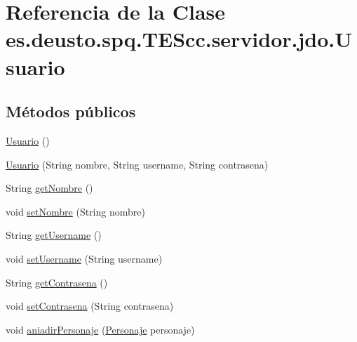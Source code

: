 \hypertarget{classes_1_1deusto_1_1spq_1_1_t_e_scc_1_1servidor_1_1jdo_1_1_usuario}{\section{Referencia de la Clase es.\+deusto.\+spq.\+T\+E\+Scc.\+servidor.\+jdo.\+Usuario}
\label{classes_1_1deusto_1_1spq_1_1_t_e_scc_1_1servidor_1_1jdo_1_1_usuario}
}
\subsection*{Métodos públicos}
\begin{DoxyCompactItemize}
\item 
\hyperlink{classes_1_1deusto_1_1spq_1_1_t_e_scc_1_1servidor_1_1jdo_1_1_usuario_a607ede79f8a7cdee04a8e3de619f1fcf}{Usuario} ()
\item 
\hyperlink{classes_1_1deusto_1_1spq_1_1_t_e_scc_1_1servidor_1_1jdo_1_1_usuario_a137a01fd100dccc041df326ca16caff6}{Usuario} (String nombre, String username, String contrasena)
\item 
String \hyperlink{classes_1_1deusto_1_1spq_1_1_t_e_scc_1_1servidor_1_1jdo_1_1_usuario_aa9175f3107f81ecc9e272a58ff9509d1}{get\+Nombre} ()
\item 
void \hyperlink{classes_1_1deusto_1_1spq_1_1_t_e_scc_1_1servidor_1_1jdo_1_1_usuario_aad7942b71efd65fd7b27d26cab1c2623}{set\+Nombre} (String nombre)
\item 
String \hyperlink{classes_1_1deusto_1_1spq_1_1_t_e_scc_1_1servidor_1_1jdo_1_1_usuario_a82df5180138094f3ed1c692e32b91c72}{get\+Username} ()
\item 
void \hyperlink{classes_1_1deusto_1_1spq_1_1_t_e_scc_1_1servidor_1_1jdo_1_1_usuario_ae4f0449c1f8731b9d7d4f4c71242b1e1}{set\+Username} (String username)
\item 
String \hyperlink{classes_1_1deusto_1_1spq_1_1_t_e_scc_1_1servidor_1_1jdo_1_1_usuario_afd1695e7957e71acbaae97c361216dd5}{get\+Contrasena} ()
\item 
void \hyperlink{classes_1_1deusto_1_1spq_1_1_t_e_scc_1_1servidor_1_1jdo_1_1_usuario_ad9432de1a0c5229aab9d6d669b3c382e}{set\+Contrasena} (String contrasena)
\item 
void \hyperlink{classes_1_1deusto_1_1spq_1_1_t_e_scc_1_1servidor_1_1jdo_1_1_usuario_a6edb840eaaf886da29ace4023f2e3455}{aniadir\+Personaje} (\hyperlink{classes_1_1deusto_1_1spq_1_1_t_e_scc_1_1servidor_1_1jdo_1_1_personaje}{Personaje} personaje)

\end{DoxyCompactItemize}
